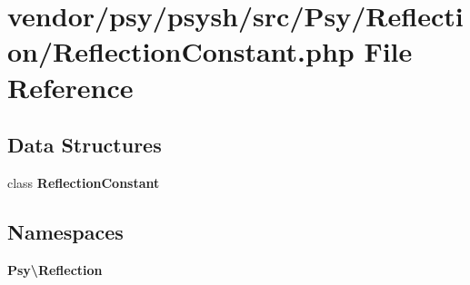 \section{vendor/psy/psysh/src/\+Psy/\+Reflection/\+Reflection\+Constant.php File Reference}
\label{_reflection_constant_8php}
\subsection*{Data Structures}
\begin{DoxyCompactItemize}
\item 
class {\bf Reflection\+Constant}
\end{DoxyCompactItemize}
\subsection*{Namespaces}
\begin{DoxyCompactItemize}
\item 
 {\bf Psy\textbackslash{}\+Reflection}
\end{DoxyCompactItemize}

